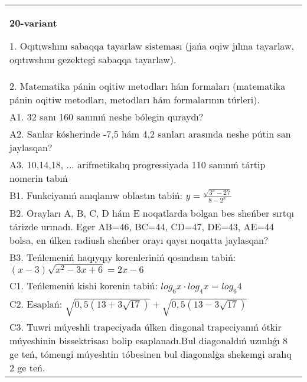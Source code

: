 \documentclass{article}
\begin{document}
\begin{tabular}{m{17cm}}
\textbf{20-variant}

1. Oqıtıwshını sabaqqa tayarlaw sisteması (jańa oqiw jılına tayarlaw, oqıtıwshını gezektegi sabaqqa tayarlaw). \\
2. Matematika pánin oqitiw metodları hám formaları (matematika pánin oqitiw metodları, metodları hám formalarının túrleri). \\
A1. 32 sanı 160 sanınıń neshe bólegin quraydı? \\
A2. Sanlar kósherinde -7,5 hám 4,2 sanları arasında neshe pútin san jaylasqan? \\
A3. 10,14,18, ... arifmetikalıq progressiyada 110 sanınıń tártip nomerin tabıń \\
B1. Funkciyanıń anıqlanıw oblastın tabiń: \(y = \frac{\sqrt{3^{x} - 27}}{8 - 2^{x}}\) \\
B2. Orayları A, B, C, D hám E noqatlarda bolgan bes sheńber sırtqı tárizde urınadı. Eger AB=46, BC=44, CD=47, DE=43, AE=44 bolsa, en úlken radiuslı sheńber orayı qaysı noqatta jaylasqan? \\
B3. Teńlemeniń haqıyqıy korenleriniń qosındısın tabiń: \((x-3) \sqrt{x^{2} - 3x + 6} = 2x - 6\) \\
C1. Teńlemeniń kishi korenin tabiń: \(log_{6}x \cdot log_{4}x = log_{6}4\) \\
C2. Esaplań: \(\sqrt{0,5 (13 + 3\sqrt{17}) } + \sqrt{0,5 (13 - 3\sqrt{17}) }\) \\
C3. Tuwri múyeshli trapeciyada úlken diagonal trapeciyanıń ótkir múyeshinin bissektrisası bolip esaplanadı.Bul diagonaldıń uzınlıǵı 8 ge teń, tómengi múyeshtin tóbesinen bul diagonalģa shekemgi aralıq 2 ge teń. \\

\end{tabular}
\vspace{1cm}
\end{document}

